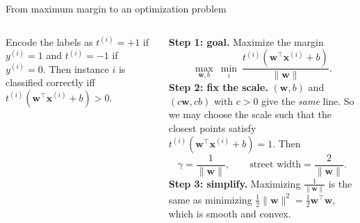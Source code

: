 \documentclass[aspectratio=169,10pt]{beamer}
\newcommand{\w}{\mathbf{w}}
\newcommand{\x}{\mathbf{x}}
\newcommand{\axes}{%
  \draw[->,gray] (-0.2,0) -- (6.3,0) node[below] {\scriptsize $x_1$};
  \draw[->,gray] (0,-0.2) -- (0,6.3) node[left] {\scriptsize $x_2$};
}
\newcommand{\posdata}{%
  \foreach \p in {(3,3),(4,2),(5,4),(4.5,3),(3.5,4.5),(5.5,2.2)} \node[ptpos] at \p {};
}
\newcommand{\negdata}{%
  \foreach \p in {(1,1),(0.5,1.5),(0.4,0.6),(1.2,0.3),(0.2,1.2)} \node[ptneg] at \p {};
}
\begin{document}
\begin{frame}{From maximum margin to an optimization problem}
\begin{columns}[c]
\centering
{}
\small
Encode the labels as $t^{(i)} = +1$ if $y^{(i)}=1$ and $t^{(i)}=-1$ if $y^{(i)}=0$. Then instance $i$ is classified correctly iff $t^{(i)}(\w^\top\x^{(i)}+b) > 0$.

\vspace{4pt}
\textbf{Step 1: goal.} Maximize the margin
\[
  \max_{\w,b}\ \min_{i}\ \frac{t^{(i)}(\w^\top\x^{(i)}+b)}{\lVert\w\rVert}.
\]
\textbf{Step 2: fix the scale.} $(\w,b)$ and $(c\w,cb)$ with $c>0$ give the \emph{same} line. So we may choose the scale such that the closest points satisfy $t^{(i)}(\w^\top\x^{(i)}+b)=1$. Then
\[
  \gamma = \frac{1}{\lVert\w\rVert}, \qquad \text{street width} = \frac{2}{\lVert\w\rVert}.
\]
\textbf{Step 3: simplify.} Maximizing $\frac{1}{\lVert\w\rVert}$ is the same as minimizing $\tfrac12\lVert\w\rVert^2=\tfrac12\w^\top\w$, which is smooth and convex.
\end{columns}
\end{frame}
\end{document}
